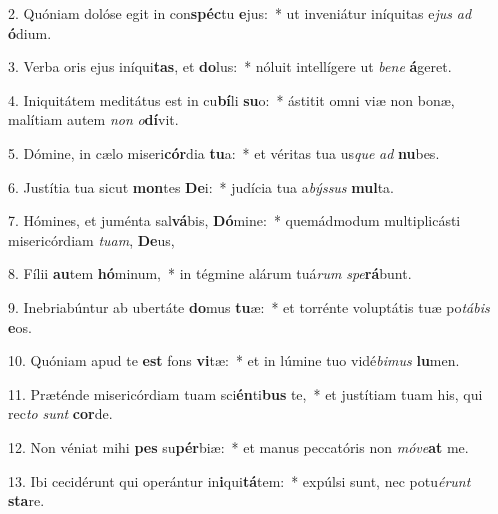2. Quóniam dolóse egit in con\textbf{spéc}tu \textbf{e}jus:~*  ut inveniátur iníquitas e\textit{jus} \textit{ad} \textbf{ó}dium.\

3. Verba oris ejus iníqui\textbf{tas}, et \textbf{do}lus:~*  nóluit intellígere ut \textit{be}\textit{ne} \textbf{á}geret.\

4. Iniquitátem meditátus est in cu\textbf{bí}li \textbf{su}o:~*  ástitit omni viæ non bonæ, malítiam autem \textit{non} \textit{o}\textbf{dí}vit.\

5. Dómine, in cælo miseri\textbf{cór}dia \textbf{tu}a:~*  et véritas tua us\textit{que} \textit{ad} \textbf{nu}bes.\

6. Justítia tua sicut \textbf{mon}tes \textbf{De}i:~*  judícia tua a\textit{býs}\textit{sus} \textbf{mul}ta.\

7. Hómines, et juménta sal\textbf{vá}bis, \textbf{Dó}mine:~*  quemádmodum multiplicásti misericórdiam \textit{tu}\textit{am}, \textbf{De}us,\

8. Fílii \textbf{au}tem \textbf{hó}minum,~*  in tégmine alárum tuá\textit{rum} \textit{spe}\textbf{rá}bunt.\

9. Inebriabúntur ab ubertáte \textbf{do}mus \textbf{tu}æ:~*  et torrénte voluptátis tuæ po\textit{tá}\textit{bis} \textbf{e}os.\

10. Quóniam apud te \textbf{est} fons \textbf{vi}tæ:~*  et in lúmine tuo vidé\textit{bi}\textit{mus} \textbf{lu}men.\

11. Præténde misericórdiam tuam sci\textbf{én}ti\textbf{bus} te,~*  et justítiam tuam his, qui rec\textit{to} \textit{sunt} \textbf{cor}de.\

12. Non véniat mihi \textbf{pes} su\textbf{pér}biæ:~*  et manus peccatóris non \textit{mó}\textit{ve}\textbf{at} me.\

13. Ibi cecidérunt qui operántur in\textbf{i}qui\textbf{tá}tem:~*  expúlsi sunt, nec potu\textit{é}\textit{runt} \textbf{sta}re.\


